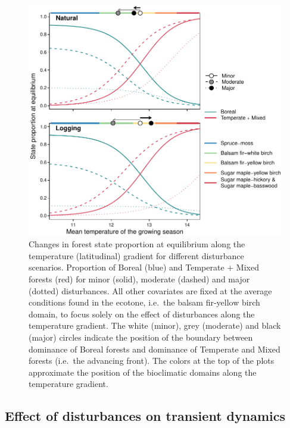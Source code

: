 \documentclass[a4paperpaper,]{article}
\begin{document}
\begin{figure}
\centering
\includegraphics{res/fig6_SS_gradient.pdf}
\caption{Changes in forest state proportion at equilibrium along the
temperature (latitudinal) gradient for different disturbance scenarios.
Proportion of Boreal (blue) and Temperate + Mixed forests (red) for
minor (solid), moderate (dashed) and major (dotted) disturbances. All
other covariates are fixed at the average conditions found in the
ecotone, i.e.~the balsam fir-yellow birch domain, to focus solely on the
effect of disturbances along the temperature gradient. The white
(minor), grey (moderate) and black (major) circles indicate the position
of the boundary between dominance of Boreal forests and dominance of
Temperate and Mixed forests (i.e.~the advancing front). The colors at
the top of the plots approximate the position of the bioclimatic domains
along the temperature gradient.}
\end{figure}

\hypertarget{effect-of-disturbances-on-transient-dynamics}{%
\subsection{Effect of disturbances on transient
dynamics}\label{effect-of-disturbances-on-transient-dynamics}}
\end{document}
